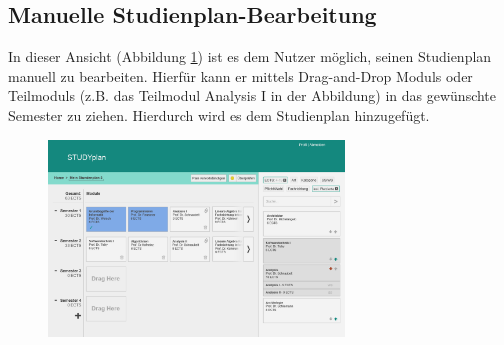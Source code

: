 \subsection{Manuelle Studienplan-Bearbeitung}
\label{subsec:gui-manuelle-bearbeitung}
In dieser Ansicht (Abbildung \ref{fig:gui-bearbeitung-1}) ist es dem Nutzer möglich, seinen \gls{Studienplan} manuell zu bearbeiten. Hierfür kann er mittels \gls{Drag-and-Drop} \glspl{Modul} oder \glspl{Teilmodul} (z.B. das \gls{Teilmodul} Analysis I in der Abbildung) in das gewünschte Semester zu ziehen. Hierdurch wird es dem \gls{Studienplan} hinzugefügt.
\begin{figure}[!htb]
	\caption{}
	\label{fig:gui-bearbeitung-1}
	\centering
	\includegraphics[width=0.7\textwidth]{../GUI/ergebnisse/bearbeitung-1.png}
\end{figure}

